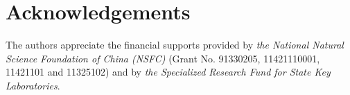 \section*{Acknowledgements}
The authors appreciate the financial supports provided by \emph{the
  National Natural Science Foundation of China (NSFC)} (Grant No.
91330205, 11421110001, 11421101 and 11325102) and by \emph{the
  Specialized Research Fund for State Key Laboratories}.


